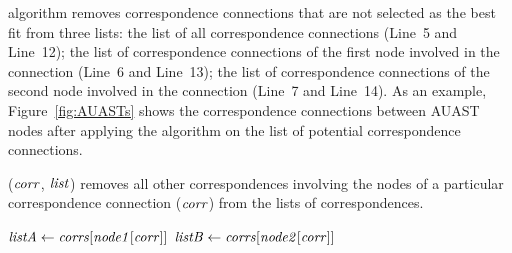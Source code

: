  algorithm removes correspondence connections that are not selected as the best fit from three lists: the list of all correspondence connections (Line~5 and Line~12);
the list of correspondence connections of the first node involved in the connection (Line~6 and Line~13); the list of correspondence connections of the second node involved in the connection (Line~7 and Line~14). As an example, Figure~\ref{fig:AUASTs} shows the correspondence connections between AUAST nodes after applying the  algorithm on the list of potential correspondence connections. 


\begin{algorithm}
\caption{($\mathit{corr}$, $\mathit{list}$) removes all other correspondences involving the nodes of a particular correspondence connection ($\mathit{corr}$) from the lists of correspondences.}
\label{removeOtherCEs}
  \begin{algorithmic}[1]
  \RemoveOtherCEs
       \State $\mathit{listA} \gets \mathit{corrs}[\mathit{node1}[\mathit{corr}]]$
	   \State $\mathit{listB} \gets \mathit{corrs}[\mathit{node2}[\mathit{corr}]]$
	   		 \EndIf
	   \EndFor		
	 	 	 		 
	   		 \EndIf
	   \EndFor	  	
  \end{algorithmic}
\end{algorithm}





